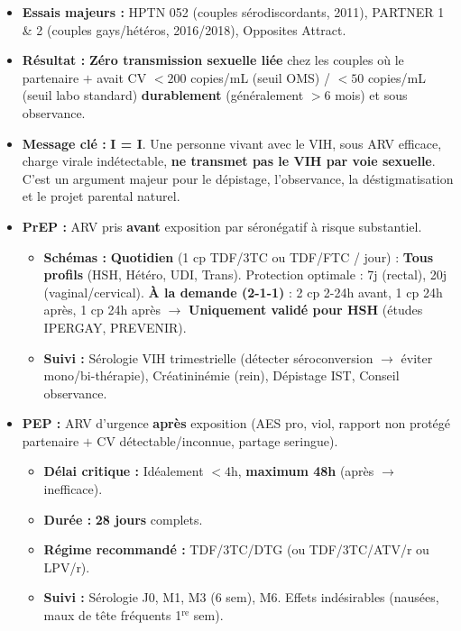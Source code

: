 \documentclass[11pt]{article}
\begin{document}
\begin{propriete}[TasP (Treatment as Prevention) / I=I (Indétectable = Intransmissible) : Preuve scientifique]
\begin{itemize}
    \item \textbf{Essais majeurs :} HPTN 052 (couples sérodiscordants, 2011), PARTNER 1 \& 2 (couples gays/hétéros, 2016/2018), Opposites Attract.
    \item \textbf{Résultat :} \textbf{Zéro transmission sexuelle liée} chez les couples où le partenaire $+$ avait CV $< 200$ copies/mL (seuil OMS) / $< 50$ copies/mL (seuil labo standard) \textbf{durablement} (généralement $> 6$ mois) et sous observance.
    \item \textbf{Message clé :} \textbf{I = I}. Une personne vivant avec le VIH, sous ARV efficace, charge virale indétectable, \textbf{ne transmet pas le VIH par voie sexuelle}. C'est un argument majeur pour le dépistage, l'observance, la déstigmatisation et le projet parental naturel.
\end{itemize}
\end{propriete}

\begin{definition}
\begin{itemize}
    \item \textbf{PrEP :} ARV pris \textbf{avant} exposition par séronégatif à risque substantiel.
        \begin{itemize}
            \item \textbf{Schémas :} \textbf{Quotidien} (1 cp TDF/3TC ou TDF/FTC / jour) : \textbf{Tous profils} (HSH, Hétéro, UDI, Trans). Protection optimale : 7j (rectal), 20j (vaginal/cervical). \textbf{À la demande (2-1-1)} : 2 cp 2-24h avant, 1 cp 24h après, 1 cp 24h après $\rightarrow$ \textbf{Uniquement validé pour HSH} (études IPERGAY, PREVENIR).
            \item \textbf{Suivi :} Sérologie VIH trimestrielle (détecter séroconversion $\rightarrow$ éviter mono/bi-thérapie), Créatininémie (rein), Dépistage IST, Conseil observance.
        \end{itemize}
    \item \textbf{PEP :} ARV d'urgence \textbf{après} exposition (AES pro, viol, rapport non protégé partenaire $+$ CV détectable/inconnue, partage seringue).
        \begin{itemize}
            \item \textbf{Délai critique :} Idéalement $< 4$h, \textbf{maximum 48h} (après $\rightarrow$ inefficace).
            \item \textbf{Durée :} \textbf{28 jours} complets.
            \item \textbf{Régime recommandé :} TDF/3TC/DTG (ou TDF/3TC/ATV/r ou LPV/r).
            \item \textbf{Suivi :} Sérologie J0, M1, M3 (6 sem), M6. Effets indésirables (nausées, maux de tête fréquents 1$^{\text{re}}$ sem).
        \end{itemize}
\end{itemize}
\end{definition}
\end{document}

